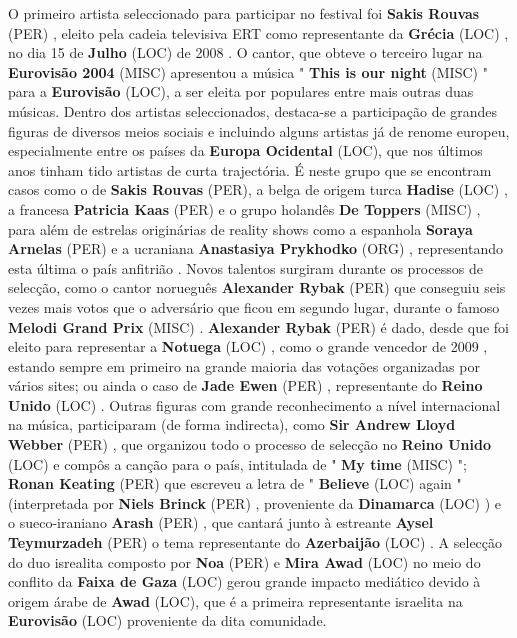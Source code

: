 \documentclass[12pt,a4paper]{article}
\begin{document}
O primeiro artista seleccionado para participar no festival foi \textbf{Sakis Rouvas} (PER) , eleito pela cadeia televisiva ERT como representante da \textbf{Grécia} (LOC) , no dia 15 de \textbf{Julho} (LOC) de 2008 . O cantor, que obteve o terceiro lugar na \textbf{Eurovisão 2004} (MISC) apresentou a música " \textbf{This is our night} (MISC) " para a \textbf{Eurovisão} (LOC), a ser eleita por populares entre mais outras duas músicas. Dentro dos artistas seleccionados, destaca-se a participação de grandes figuras de diversos meios sociais e incluindo alguns artistas já de renome europeu, especialmente entre os países da \textbf{Europa Ocidental} (LOC), que nos últimos anos tinham tido artistas de curta trajectória. É neste grupo que se encontram casos como o de \textbf{Sakis Rouvas} (PER), a belga de origem turca \textbf{Hadise} (LOC) , a francesa \textbf{Patricia Kaas} (PER) e o grupo holandês \textbf{De Toppers} (MISC) , para além de estrelas originárias de reality shows como a espanhola \textbf{Soraya Arnelas} (PER) e a ucraniana \textbf{Anastasiya Prykhodko} (ORG) , representando esta última o país anfitrião . Novos talentos surgiram durante os processos de selecção, como o cantor norueguês \textbf{Alexander Rybak} (PER) que conseguiu seis vezes mais votos que o adversário que ficou em segundo lugar, durante o famoso \textbf{Melodi Grand Prix} (MISC) . \textbf{Alexander Rybak} (PER) é dado, desde que foi eleito para representar a \textbf{Notuega} (LOC) , como o grande vencedor de 2009 , estando sempre em primeiro na grande maioria das votações organizadas por vários sites; ou ainda o caso de \textbf{Jade Ewen} (PER) , representante do \textbf{Reino Unido} (LOC) . Outras figuras com grande reconhecimento a nível internacional na música, participaram (de forma indirecta), como \textbf{Sir Andrew Lloyd Webber} (PER) , que organizou todo o processo de selecção no \textbf{Reino Unido} (LOC) e compôs a canção para o país, intitulada de " \textbf{My time} (MISC) "; \textbf{Ronan Keating} (PER) que escreveu a letra de " \textbf{Believe} (LOC) again " (interpretada por \textbf{Niels Brinck} (PER) , proveniente da \textbf{Dinamarca} (LOC) ) e o sueco-iraniano \textbf{Arash} (PER) , que cantará junto à estreante \textbf{Aysel Teymurzadeh} (PER) o tema representante do \textbf{Azerbaijão} (LOC) . A selecção do duo isrealita composto por \textbf{Noa} (PER) e \textbf{Mira Awad} (LOC) no meio do conflito da \textbf{Faixa de Gaza} (LOC) gerou grande impacto mediático devido à origem árabe de \textbf{Awad} (LOC), que é a primeira representante israelita na \textbf{Eurovisão} (LOC) proveniente da dita comunidade.
\end{document}
